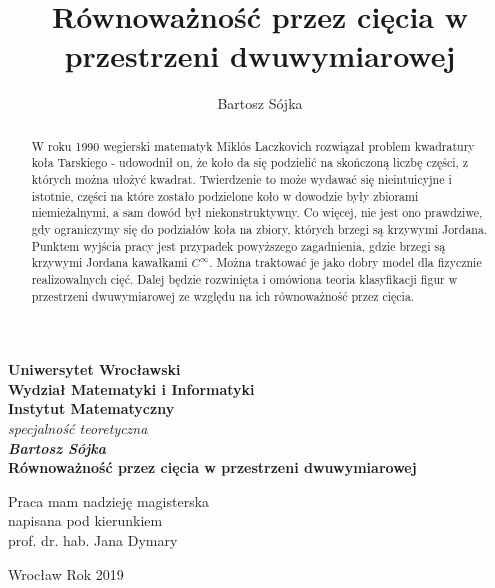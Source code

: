 \documentclass[a4paper, 12pt]{article}
\title{Równoważność przez cięcia w przestrzeni dwuwymiarowej}
\author{Bartosz Sójka}
\begin{document}
\thispagestyle{empty}
\begin{center}
\textbf{\large Uniwersytet Wrocławski\\
Wydział Matematyki i Informatyki\\
Instytut Matematyczny}\\
\textit{\large specjalność teoretyczna}\\
\vspace{4cm}
\textbf{\textit{\large Bartosz Sójka}\\
\vspace{0.5cm}
{\Large Równoważność przez cięcia w przestrzeni dwuwymiarowej}}\\
\end{center}
\vspace{3cm}
{\large \hspace*{6.5cm}Praca mam nadzieję magisterska\\
\hspace*{6.5cm}napisana pod kierunkiem\\
\hspace*{6.5cm}prof. dr. hab. Jana Dymary }\\
\vfill
\begin{center}
{\large Wrocław Rok 2019}\\
\end{center}
\newpage
\null
\thispagestyle{empty}
\newpage
\tableofcontents

\begin{abstract}
    W roku 1990 wegierski matematyk Miklós Laczkovich rozwiązał problem kwadratury koła Tarskiego - udowodnił
     on, że koło da się podzielić na skończoną liczbę części, z których można ułożyć kwadrat. Twierdzenie
     to może wydawać się nieintuicyjne i istotnie, części na które zostało podzielone koło w dowodzie były
     zbiorami niemieżalnymi, a sam dowód był niekonstruktywny. Co więcej, nie jest ono prawdziwe, gdy
     ograniczymy się do podziałów koła na zbiory, których brzegi są krzywymi Jordana. Punktem wyjścia
     pracy jest przypadek powyższego zagadnienia, gdzie brzegi są krzywymi Jordana kawałkami $C^\infty$.
     Można traktować je jako dobry model dla fizycznie realizowalnych cięć. Dalej będzie rozwinięta i
     omówiona teoria klasyfikacji figur w przestrzeni dwuwymiarowej ze względu na ich równoważność przez
     cięcia.
 \end{abstract}
\end{document}

